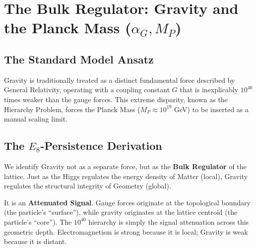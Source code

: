 \section{The Bulk Regulator: Gravity and the Planck Mass (\texorpdfstring{$\alpha_G, M_P$}{alphaGMP})}
\label{sec:bulk_regulator}





\subsection{The Standard Model Ansatz}
Gravity is traditionally treated as a distinct fundamental force described by General Relativity, operating with a coupling constant $G$ that is inexplicably $10^{40}$ times weaker than the gauge forces. This extreme disparity, known as the Hierarchy Problem, forces the Planck Mass ($M_P \approx 10^{19}$ GeV) to be inserted as a manual scaling limit.

\subsection{The \texorpdfstring{$E_8$}{E8}-Persistence Derivation}
We identify Gravity not as a separate force, but as the \textbf{Bulk Regulator} of the lattice. Just as the Higgs regulates the energy density of Matter (local), Gravity regulates the structural integrity of Geometry (global).

It is an \textbf{Attenuated Signal}. Gauge forces originate at the topological boundary (the particle's ``surface''), while gravity originates at the lattice centroid (the particle's ``core''). The $10^{40}$ hierarchy is simply the signal attenuation across this geometric depth. Electromagnetism is strong because it is local; Gravity is weak because it is distant.


